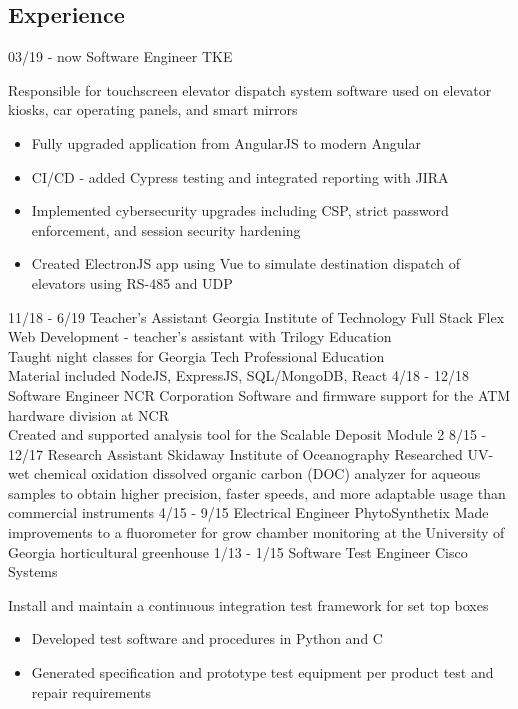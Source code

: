 \documentclass[]{cv}
\begin{document}
\begin{body}
	\section{Experience}
    	\begin{entrylist}
    		\entry
    		{03/19 - now}
    		{Software Engineer}
    		{TKE}
    		{Responsible for touchscreen elevator dispatch system software used on elevator kiosks, car operating panels, and smart mirrors
    			\begin{itemize}
                    \item {Fully upgraded application from AngularJS to modern Angular}
                    \item {CI/CD - added Cypress testing and integrated reporting with JIRA }
                    \item {Implemented cybersecurity upgrades including CSP, strict password enforcement, and session security hardening}
    				\item {Created ElectronJS app using Vue to simulate destination dispatch of elevators using RS-485 and UDP}
    			\end{itemize}
            }
    		\entry 
    		{11/18 - 6/19}
    		{Teacher's Assistant}
    		{Georgia Institute of Technology}
    		{Full Stack Flex Web Development - teacher's assistant with Trilogy Education\\
    		Taught night classes for Georgia Tech Professional Education\\
    	    Material included NodeJS, ExpressJS, SQL/MongoDB, React}
    		\entry
    		{4/18 - 12/18}
    		{Software Engineer}
    		{NCR Corporation}
    		{Software and firmware support for the ATM hardware division at NCR \\
    		Created and supported analysis tool for the Scalable Deposit Module 2}
    		\entry
    		{8/15 - 12/17}
    		{Research Assistant}
    		{Skidaway Institute of Oceanography}
    		{Researched UV-wet chemical oxidation dissolved organic carbon (DOC) analyzer for aqueous samples to obtain higher precision, faster speeds, and more adaptable usage than commercial instruments
    		}		  
          \entry
          {4/15 - 9/15}
          {Electrical Engineer}
          {PhytoSynthetix}
          {Made improvements to a fluorometer for grow chamber monitoring at the University of Georgia horticultural greenhouse}
          \entry
          {1/13 - 1/15}
          {Software Test Engineer}
          {Cisco Systems}
          {Install and maintain a continuous integration test framework for set top boxes
          	\begin{itemize}
          		\item {Developed test software and procedures in Python and C}
          		\item {Generated specification and prototype test equipment per product test and repair requirements}
          	\end{itemize}
          }
        \end{entrylist}
        \vspace{0.05cm}

\end{body}
\end{document}
